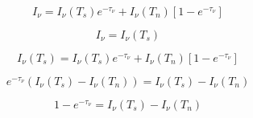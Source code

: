 \documentclass[12pt]{article}
\begin{document}
\begin{equation}
I_{\nu} = I_{\nu}(T_s)e^{-\tau_{\nu}} + I_{\nu}(T_n)\left[ 1 - e^{-\tau_{\nu}} \right]
\end{equation}

\begin{equation}
I_{\nu} = I_{\nu}(T_s)
\end{equation}

\begin{equation}
I_{\nu}(T_s) = I_{\nu}(T_s)e^{-\tau_{\nu}} + I_{\nu}(T_n)\left[ 1 - e^{-\tau_{\nu}} \right]
\end{equation}

\begin{equation}
e^{-\tau_{\nu}}(I_{\nu}(T_s) - I_{\nu}(T_n)) = I_{\nu}(T_s) - I_{\nu}(T_n)
\end{equation}

\begin{equation}
1 - e^{-\tau_{\nu}} = I_{\nu}(T_s) - I_{\nu}(T_n)
\end{equation}
\end{document}
